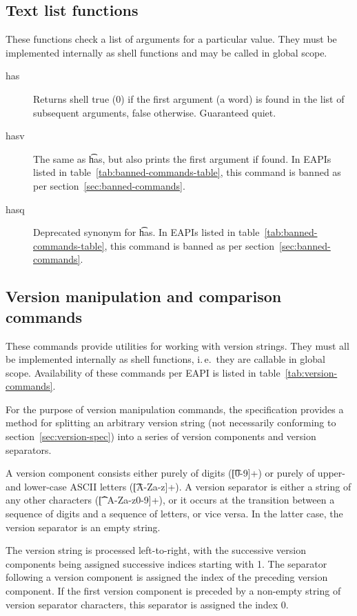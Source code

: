 \subsection{Text list functions}
These functions check a list of arguments for a particular value. They must be implemented
internally as shell functions and may be called in global scope.
\nobreakpar
\begin{description}
\item[has] Returns shell true (0) if the first argument (a word) is found in the list of subsequent
    arguments, false otherwise. Guaranteed quiet.
\item[hasv] The same as \t{has}, but also prints the first argument if found.
    In EAPIs listed in table~\ref{tab:banned-commands-table}, this command is banned as per
    section~\ref{sec:banned-commands}.
\item[hasq] Deprecated synonym for \t{has}.
    In EAPIs listed in table~\ref{tab:banned-commands-table}, this command is banned as per
    section~\ref{sec:banned-commands}.
\end{description}

\subsection{Version manipulation and comparison commands}
These commands provide utilities for working with version strings. They must all be implemented
internally as shell functions, i.\,e.\ they are callable in global scope. Availability of these
commands per EAPI is listed in table~\ref{tab:version-commands}.

For the purpose of version manipulation commands, the specification provides a method for splitting
an arbitrary version string (not necessarily conforming to section~\ref{sec:version-spec}) into
a series of version components and version separators.

A version component consists either purely of digits (\t{[0-9]+}) or purely of upper- and
lower-case ASCII letters (\t{[A-Za-z]+}). A version separator is either a string of any other
characters (\t{[\textasciicircum A-Za-z0-9]+}), or it occurs at the transition between a sequence
of digits and a sequence of letters, or vice versa. In the latter case, the version separator is
an empty string.

The version string is processed left-to-right, with the successive version components being assigned
successive indices starting with 1. The separator following a version component is assigned
the index of the preceding version component. If the first version component is preceded by
a non-empty string of version separator characters, this separator is assigned the index 0.

